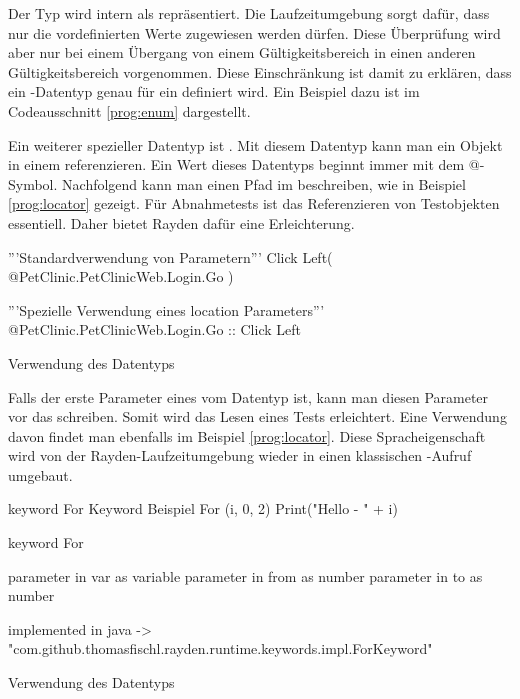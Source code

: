 \SuperPar
Der Typ  wird intern als  repräsentiert. Die Laufzeitumgebung sorgt dafür, dass nur die vordefinierten Werte zugewiesen werden dürfen. Diese Überprüfung wird aber nur bei einem Übergang von einem Gültigkeitsbereich in einen anderen Gültigkeitsbereich vorgenommen. Diese Einschränkung ist damit zu erklären, dass ein -Datentyp genau für ein  definiert wird. Ein Beispiel dazu ist im Codeausschnitt \ref{prog:enum} dargestellt.  

\SuperPar
Ein weiterer spezieller Datentyp ist . Mit diesem Datentyp kann man ein Objekt in einem  referenzieren. Ein Wert dieses Datentyps beginnt immer mit dem @-Symbol. Nachfolgend kann man einen Pfad im  beschreiben, wie in Beispiel \ref{prog:locator} gezeigt. Für Abnahmetests ist das Referenzieren von Testobjekten essentiell. Daher bietet Rayden dafür eine Erleichterung. 

\begin{program}
\begin{JavaCode}
'''Standardverwendung von Parametern'''
Click Left( @PetClinic.PetClinicWeb.Login.Go )

'''Spezielle Verwendung eines location Parameters'''
@PetClinic.PetClinicWeb.Login.Go :: Click Left
\end{JavaCode}
\caption{Verwendung des Datentyps }
\label{prog:locator}
\end{program}

\SuperPar
Falls der erste Parameter eines  vom Datentyp  ist, kann man diesen Parameter vor das  schreiben. Somit wird das Lesen eines Tests erleichtert. Eine Verwendung davon findet man ebenfalls im Beispiel \ref{prog:locator}. Diese Spracheigenschaft wird von der Rayden-Laufzeitumgebung wieder in einen klassischen -Aufruf umgebaut.

\begin{program}
\begin{JavaCode}
keyword For Keyword Beispiel {
	For (i, 0, 2) {
		Print("Hello - " + i)
	}
}

keyword For { 
	parameter in var as variable
	parameter in from as number
	parameter in to as number

	implemented in java -> "com.github.thomasfischl.rayden.runtime.keywords.impl.ForKeyword"
}
\end{JavaCode}
\caption{Verwendung des Datentyps }
\label{prog:variable}
\end{program}

